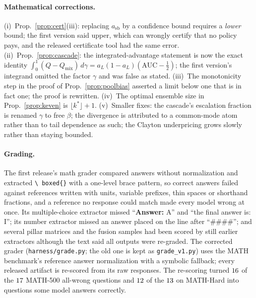 \documentclass[11pt]{article}
\theoremstyle{plain}
\theoremstyle{definition}
\begin{document}
\paragraph{Mathematical corrections.} (i)~Prop.~\ref{prop:cert}(iii): replacing $a_{\mathrm{sb}}$ by a confidence bound requires
a \emph{lower} bound; the first version said upper, which can wrongly certify that no policy pays, and the released certificate
tool had the same error. (ii)~Prop.~\ref{prop:cascade}: the integrated-advantage statement is now the exact identity
$\int_0^1(Q-Q_{\mathrm{mix}})\,d\gamma=a_L(1-a_L)(\mathrm{AUC}-\tfrac12)$; the first version's integrand omitted the factor
$\gamma$ and was false as stated. (iii)~The monotonicity step in the proof of Prop.~\ref{prop:poolbias} asserted a limit below
one that is in fact one; the proof is rewritten. (iv)~The optimal ensemble size in Prop.~\ref{prop:keven} is
$\lfloor k^\ast\rfloor+1$. (v)~Smaller fixes: the cascade's escalation fraction is renamed $\gamma$ to free $\beta$; the divergence is
attributed to a common-mode atom rather than to tail dependence as such; the Clayton underpricing grows slowly rather than
staying bounded.

\paragraph{Grading.} The first release's math grader compared answers without normalization and extracted \texttt{\textbackslash
boxed\{\}} with a one-level brace pattern, so correct answers failed against references written with units, variable prefixes,
thin spaces or shorthand fractions, and a reference no response could match made every model wrong at once. Its
multiple-choice extractor missed ``\textbf{Answer:} A'' and ``the final answer is: I''; its number extractor missed an answer
placed on the line after ``\#\#\#\#''; and several pillar matrices and the fusion samples had been scored by still earlier
extractors although the text said all outputs were re-graded. The corrected grader (\texttt{harness/grade.py}; the old one is
kept as \texttt{grade\_v1.py}) uses the MATH benchmark's reference answer normalization with a symbolic fallback; every released
artifact is re-scored from its raw responses. The re-scoring turned $16$ of the $17$ MATH-500 all-wrong
questions and $12$ of the $13$ on MATH-Hard into questions some model answers correctly.
\end{document}
